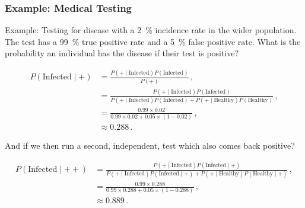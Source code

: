 \subsubsection{Example: Medical Testing}
\label{stats:Bayes_rule:medical_test}

Example: Testing for disease with a \SI{2}{\percent} incidence rate in the wider population.
The test has a \SI{99}{\percent} true positive rate and a \SI{5}{\percent} false positive rate.
What is the probability an individual has the disease if their test is positive?

\begin{equation}\label{eq:stats:Bayes_rule:medical_test_1}
\begin{split}
P\left(\text{Infected} \mid +\right) &= \frac{P\left(+ \mid \text{Infected}\right) P\left(\text{Infected}\right)}{P\left(+\right)}\,, \\
 &= \frac{P\left(+ \mid \text{Infected}\right) P\left(\text{Infected}\right)}{
P\left(+ \mid \text{Infected}\right)P\left(\text{Infected}\right) + P\left(+ \mid \text{Healthy}\right)P\left(\text{Healthy}\right)}\,, \\
&= \frac{\num{0.99} \times \num{0.02}}{\num{0.99} \times \num{0.02} + \num{0.05} \times \left(1-\num{0.02}\right)}\,, \\
&\approx \num{0.288}\,.
\end{split}
\end{equation}

\noindent And if we then run a second, independent, test which also comes back positive?

\begin{equation}\label{eq:stats:Bayes_rule:medical_test_2}
\begin{split}
P\left(\text{Infected} \mid ++\right) &= \frac{P\left(+ \mid \text{Infected}\right) P\left(\text{Infected} \mid +\right)}{
P\left(+ \mid \text{Infected}\right)P\left(\text{Infected} \mid +\right) + P\left(+ \mid \text{Healthy}\right)P\left(\text{Healthy} \mid +\right)}\,, \\
&= \frac{\num{0.99} \times \num{0.288}}{\num{0.99} \times \num{0.288} + \num{0.05} \times \left(1-\num{0.288}\right)}\,, \\
&\approx \num{0.889}\,.
\end{split}
\end{equation}

